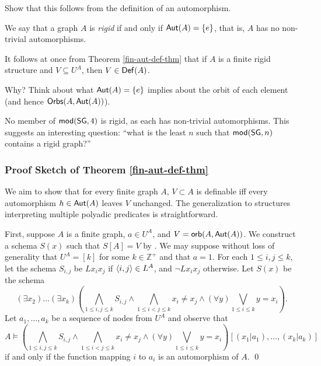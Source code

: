 \begin{aside}
    Show that this follows from the definition of an automorphism.
\end{aside}

\begin{definition}
    We say that a graph $A$ is \emph{rigid} if and only if $\mbox{$\mathsf{Aut}(A)$}=\{e\}$, that is, $A$ has no non-trivial automorphisms.
\end{definition}

It follows at once from Theorem \ref{fin-aut-def-thm} that if $A$ is a finite rigid structure and $V\subseteq U^A$, then $V\in\mbox{$\mathsf{Def}(A)$}$.

\begin{aside}
    Why? Think about what $\mbox{$\mathsf{Aut}(A)$}=\{e\}$ implies about the orbit of each element (and hence $\mbox{$\mathsf{Orbs}(A,\mbox{$\mathsf{Aut}(A)$})$}$). 
\end{aside}

\begin{aside}
    No member of $\mbox{$\mathsf {mod}(\mbox{$\mathsf{SG}$},4)$}$ is rigid, as each has non-trivial automorphisms. This suggests an interesting question: ``what is the least $n$ such that $\mbox{$\mathsf {mod}(\mbox{$\mathsf{SG}$},n)$}$ contains a rigid graph?''
\end{aside}

\subsubsection*{Proof Sketch of Theorem \ref{fin-aut-def-thm}}
We aim to show that for every finite graph $A$, $V \subset A$ is definable iff every automorphism $h \in \mbox{$\mathsf{Aut}(A)$}$ leaves $V$ unchanged. The generalization to structures interpreting multiple polyadic predicates is straightforward.

First, suppose $A$ is a finite graph, $a\in U^A$, and $V=\mbox{$\mathsf{orb}(A,\mbox{$\mathsf{Aut}(A)$})$}$. We construct a schema $S(x)$ such that $S[A]=V$ by . We may suppose without loss of generality that $U^A=[k]$ for some $k\in\mathbb{Z}^+$ and that $a=1$. For each $1\leq i,j\leq k$, let the schema $S_{i,j}$ be $Lx_ix_j$ if $\mbox{$\langle i,j \rangle$}\in L^A$, and $\neg Lx_ix_j$ otherwise. Let $S(x)$ be the schema
\[
(\exists x_2)\ldots(\exists x_k)(\bigwedge_{1\leq i,j\leq k}S_{i,j}\wedge\bigwedge_{1\leq i<j\leq k}x_i\neq x_j\wedge(\forall y)\bigvee_{1\leq i\leq k} y=x_i).
\] 
Let $a_1,\dots,a_k$ be a sequence of nodes from $U^A$ and observe that
\[
A\models(\bigwedge_{1\leq i,j\leq k}S_{i,j}\wedge\bigwedge_{1\leq i<j\leq k}x_i\neq x_j\wedge(\forall y)\bigvee_{1\leq i\leq k} y=x_i)[(x_1|a_1),\ldots,(x_k|a_k)]
\]
if and only if the function mapping $i$ to $a_i$ is an automorphism of $A$. \qed


